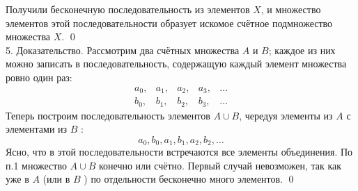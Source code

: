 \documentclass[a4paper]{article}
\begin{document}
 Получили бесконечную последовательность из элементов $X$, и множество элементов этой последовательности образует искомое счётное подмножество множества $X$. \qed\\[2mm]
 5. Доказательство. Рассмотрим два счётных множества $A$ и $B$; каждое из них можно записать в последовательность, содержащую каждый элемент множества ровно один раз:
$$
\begin{array}{lllll}
a_{0}, & a_{1}, & a_{2}, & a_{3}, & \ldots \\
b_{0}, & b_{1}, & b_{2}, & b_{3}, & \ldots
\end{array}
$$
 Теперь построим последовательность элементов $A \cup B$, чередуя элементы из $A$ с элементами из $B$ :
$$
a_{0}, b_{0}, a_{1}, b_{1}, a_{2}, b_{2}, \ldots
$$
 Ясно, что в этой последовательности встречаются все элементы объединения. По п.1 множество $A \cup B$ конечно или счётно. Первый случай невозможен, так как уже в $A$ (или в $B$ ) по отдельности бесконечно много элементов. \qed
\end{document}
